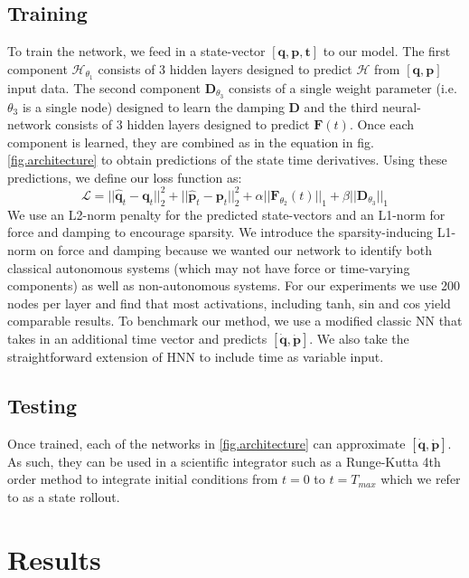 \documentclass[twoside]{article}
\begin{document}
\subsection*{Training}
To train the network, we feed in a state-vector $ [\mathbf{q},\mathbf{p},\mathbf{t}]$ to our model. The first component $\mathcal{H}_{\theta_1}$ consists of 3 hidden layers designed to predict $\mathcal{H}$ from $[\mathbf{q},\mathbf{p}]$ input data. The second component $\mathbf{D}_{\theta_3}$ consists of a single weight parameter (i.e. $\theta_3$ is a single node) designed to learn the damping $\mathbf{D}$ and the third neural-network consists of 3 hidden layers designed to predict $\mathbf{F}(t)$. Once each component is learned, they are combined as in the equation in fig.\ref{fig.architecture} to obtain predictions of the state time derivatives. Using these predictions, we define our loss function as:
\begin{equation}
\mathcal{L} =|| \hat{\mathbf{q}}_t - \mathbf{q}_t ||_2^2 +
|| \hat{\mathbf{p}}_t -\mathbf{p}_t ||_2^2 + \alpha|| \mathbf{F}_{\theta_2} (t)||_1 + \beta||\mathbf{D}_{\theta_3}||_1 
\end{equation}
We use an L2-norm penalty for the predicted state-vectors and an L1-norm for force and damping to encourage sparsity. We introduce the sparsity-inducing L1-norm on force and damping because we wanted our network to identify both classical autonomous systems (which may not have force or time-varying components) as well as non-autonomous systems. For our experiments we use 200 nodes per layer and find that most activations, including tanh, sin and cos yield comparable results. To benchmark our method, we use a modified classic NN that takes in an additional time vector and predicts $[\dot{\mathbf{q}},\dot{\mathbf{p}}]$. We also take the straightforward extension of HNN to include time as variable input. 

\subsection*{Testing}
Once trained, each of the networks in \ref{fig.architecture} can approximate $[\dot{\mathbf{q}},\dot{\mathbf{p}}]$. As such, they can be used in a scientific integrator such as a Runge-Kutta 4th order method to integrate initial conditions from $t=0$ to $t=T_{max}$ which we refer to as a state rollout. 


\section{Results}
\end{document}
